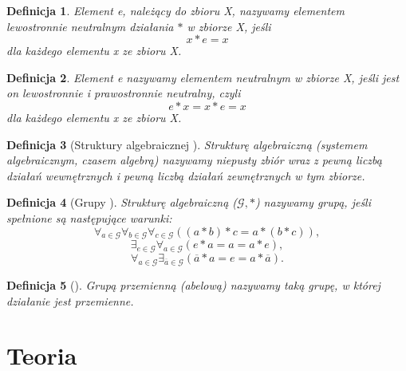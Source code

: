 \documentclass[12pt,a4paper]{report}
\newtheorem{definition}{Definicja}
\begin{document}
\begin{definition}
Element e, należący do zbioru X, nazywamy elementem lewostronnie neutralnym działania $\ast$ w zbiorze X, jeśli
\begin{equation*}
x\ast e = x
\end{equation*} 
dla każdego elementu x ze zbioru X.
\end{definition}
\begin{definition}
Element e nazywamy elementem neutralnym w zbiorze X, jeśli jest on lewostronnie i prawostronnie neutralny, czyli
\begin{equation*}
e\ast x = x\ast e = x
\end{equation*}
dla każdego elementu x ze zbioru X.
\end{definition}
\begin{definition}[Struktury algebraicznej \citep{jedrzejewski2011algebra}]
Strukturę algebraiczną (systemem algebraicznym, czasem algebrą) nazywamy niepusty zbiór wraz z pewną liczbą działań wewnętrznych i pewną liczbą działań zewnętrznych w tym zbiorze.
\end{definition}
\begin{definition}[Grupy \citep{jedrzejewski2011algebra}]
Strukturę algebraiczną ($\mathcal{G},\ast$) nazywamy grupą, jeśli spełnione są następujące warunki:
\begin{equation*}
\forall_{a\in \mathcal{G}} \forall_{b\in \mathcal{G}} \forall_{c\in \mathcal{G}} ((a\ast b)\ast c=a\ast (b\ast c)),
\end{equation*}
\begin{equation*}
\exists_{e\in \mathcal{G}} \forall_{a\in \mathcal{G}}(e\ast a=a=a\ast e),
\end{equation*}
\begin{equation*}
\forall_{a \in \mathcal{G}} \exists_{\overline{a}\in\mathcal{G}}(\overline{a}\ast a=e=a\ast \overline{a}).
\end{equation*}
\end{definition}
\begin{definition}[\citep{jedrzejewski2011algebra}]
Grupą przemienną (abelową) nazywamy taką grupę, w której działanie jest przemienne.
\end{definition}


\chapter{Teoria}
\end{document}
